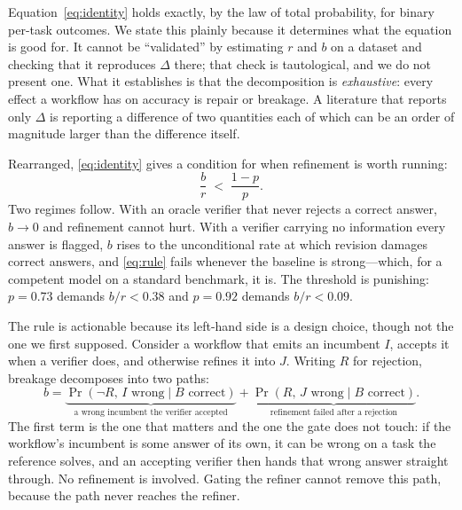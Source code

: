 \documentclass{article}
\newcommand{\rrate}{r}
\newcommand{\brate}{b}
\begin{document}
Equation~\ref{eq:identity} holds exactly, by the law of total probability, for
binary per-task outcomes. We state this plainly because it determines what the
equation is good for. It cannot be ``validated'' by estimating $\rrate$ and
$\brate$ on a dataset and checking that it reproduces $\Delta$ there; that check
is tautological, and we do not present one. What it establishes is that the
decomposition is \emph{exhaustive}: every effect a workflow has on accuracy is
repair or breakage. A literature that reports only $\Delta$ is reporting a
difference of two quantities each of which can be an order of magnitude larger
than the difference itself.

Rearranged, \eqref{eq:identity} gives a condition for when refinement is worth
running:
\begin{equation}
\frac{\brate}{\rrate} \;<\; \frac{1-p}{p}.
\label{eq:rule}
\end{equation}
Two regimes follow. With an oracle verifier that never rejects a correct answer,
$\brate \to 0$ and refinement cannot hurt. With a verifier carrying no
information every answer is flagged, $\brate$ rises to the unconditional rate at
which revision damages correct answers, and \eqref{eq:rule} fails whenever the
baseline is strong---which, for a competent model on a standard benchmark, it
is. The threshold is punishing: $p=0.73$ demands $\brate/\rrate < 0.38$ and
$p=0.92$ demands $\brate/\rrate < 0.09$.

The rule is actionable because its left-hand side is a design choice, though not
the one we first supposed. Consider a workflow that emits an incumbent $I$,
accepts it when a verifier does, and otherwise refines it into $J$. Writing $R$
for rejection, breakage decomposes into two paths:
\begin{equation}
\brate = \underbrace{\Pr(\neg R,\, I \text{ wrong} \mid B\text{ correct})}
         _{\text{a wrong incumbent the verifier accepted}}
       + \underbrace{\Pr(R,\, J \text{ wrong} \mid B\text{ correct})}
         _{\text{refinement failed after a rejection}} .
\label{eq:twoterm}
\end{equation}
The first term is the one that matters and the one the gate does not touch: if
the workflow's incumbent is some answer of its own, it can be wrong on a task
the reference solves, and an accepting verifier then hands that wrong answer
straight through. No refinement is involved. Gating the refiner cannot remove
this path, because the path never reaches the refiner.
\end{document}

